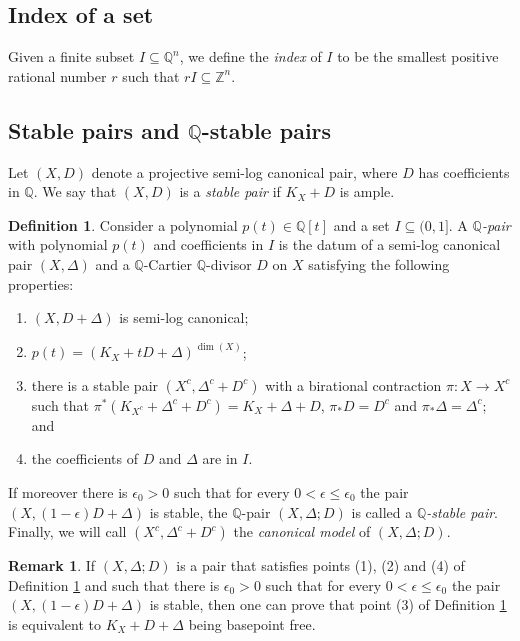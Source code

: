 \documentclass{amsart}
\newcommand{\bQ}{\mathbb{Q}}
\theoremstyle{definition}
\newtheorem{Def}[theorem]{Definition}
\newtheorem{Remark}[theorem]{Remark}
\renewcommand{\qq}{\mathbb{Q}}
\begin{document}
\subsection{Index of a set}\label{indice}
Given a finite subset $I \subseteq \mathbb{Q}^n$, we define the \emph{index} of $I$ to be the smallest positive rational number $r$ such that $rI\subseteq \mathbb{Z}^n$.

\subsection{Stable pairs and $\bQ$-stable pairs} \label{p-pairs section}
Let $(X,D)$ denote a projective semi-log canonical pair, where $D$ has coefficients in $\qq$.
We say that $(X,D)$ is a \emph{stable pair} if $K_X + D$ is ample.
\begin{Def}\label{def_p-pair}
Consider a polynomial $p(t)\in \mathbb{Q}[t]$ and a set $I\subseteq (0,1]$.
A \emph{$\bQ$-pair} with polynomial $p(t)$ and coefficients in $I$ is the datum of a semi-log canonical pair $(X,\Delta)$ and a $\qq$-Cartier $\qq$-divisor $D$ on $X$ satisfying the following properties:
\begin{enumerate}
    \item $(X,D+\Delta)$ is semi-log canonical;
    \item $p(t) = (K_X+tD+\Delta)^{\dim(X)}$; 
    \item there is a stable pair $(X^c,\Delta^c+D^c)$ with a birational contraction $\pi \colon X\to X^c$ such that $\pi^*(K_{X^c}+\Delta^c + D^c) = K_{X}+\Delta + D$, $\pi_*D=D^c$ and $\pi_*\Delta=\Delta^c$; and
    \item the coefficients of $D$ and $\Delta$ are in $I$.
\end{enumerate}
If moreover there is $\epsilon_0>0$ such that for every $0<\epsilon \le\epsilon_0$ the pair $(X,(1-\epsilon)D+\Delta)$ is stable, the $\bQ$-pair $(X,\Delta;D)$ is called a \emph{$\bQ$-stable pair}. Finally, we will call $(X^c,\Delta^c+D^c)$ the \emph{canonical model} of $(X,\Delta; D)$.\end{Def}

\begin{Remark}
If $(X,\Delta;D)$ is a pair that satisfies points (1), (2) and (4) of Definition \ref{def_p-pair} and such that there is $\epsilon_0>0$ such that for every $0<\epsilon \le\epsilon_0$ the pair $(X,(1-\epsilon)D+\Delta)$ is stable, then one can prove that point (3) of Definition \ref{def_p-pair} is equivalent to $K_X+D+\Delta$ being basepoint free.
\end{Remark}
\end{document}
